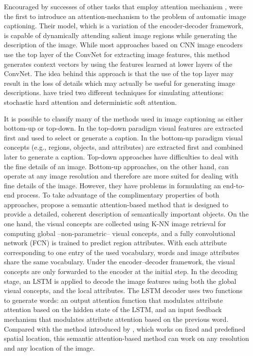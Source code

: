 Encouraged by successes of other tasks that employ attention mechanism \citet{Mnih2014, LeiBa2015}, \citet{Xu2015} were the first to introduce an attention-mechanism to the problem of automatic image captioning. Their model, which is a variation of the encoder-decoder framework, is capable of dynamically attending salient image regions while generating the description of the image. While most approaches based on CNN image encoders use the top layer of the ConvNet for extracting image features, this method generates context vectors by using the features learned at lower layers of the ConvNet. The idea behind this approach is that the use of the top layer may result in the loss of details which may actually be useful for generating image descriptions. \citeauthor{Xu2015} have tried two different techniques for simulating attentions: stochastic hard attention and deterministic soft attention.

It is possible to classify many of the methods used in image captioning as either bottom-up or top-down. In the top-down paradigm \citep{Donahue2015, Karpathy2015, Chen2015, Mao2015_mRNN, Mao2015_Child, Vinyals2015,Xu2015} visual features are extracted first and used to select or generate a caption. In the bottom-up paradigm \citep{Farhadi2010, Kulkarni2011, Li2011, Kuznetsova2012, Elliott2013, Lebret2015a} visual concepts (e.g., regions, objects, and attributes) are extracted first and combined later to generate a caption. Top-down approaches have difficulties to deal with the fine details of an image. Bottom-up approaches, on the other hand, can operate at any image resolution and therefore are more suited for dealing with  fine details of the image. However, they have problems in formulating an end-to-end process. To take advantage of the complimentary properties of both approaches, \citet{You2016} propose a semantic attention-based method that is designed to provide a detailed, coherent description of semantically important objects. On the one hand, the visual concepts are collected using K-NN image retrieval for computing global --non-parametric-- visual concepts, and a fully convolutional network (FCN) \citep{Long2015} is trained to predict region attributes. With each attribute corresponding to one entry of the used vocabulary, words and image attributes share the same vocabulary. Under the encoder–decoder framework, the visual concepts are only forwarded to the encoder at the initial step. In the decoding stage, an LSTM is applied to decode the image features using both the global visual concepts, and the local attributes. The LSTM decoder uses two functions to generate words: an output attention function that modulates attribute attention based on the hidden state of the LSTM, and an input feedback mechanism that modulates attribute attention based on the previous word. Compared with the method introduced by \citet{Xu2015}, which works on fixed and predefined spatial location, this semantic attention-based method can work on any resolution and any location of the image.

